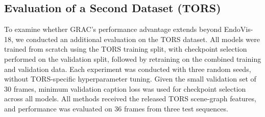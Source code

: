 \documentclass[11pt]{article}
\begin{document}
\subsection{Evaluation of a Second Dataset (TORS)}\label{subsec5.3}

To examine whether GRAC's performance advantage extends beyond EndoVis-18, we conducted an additional evaluation on the TORS dataset. All models were trained from scratch using the TORS training split, with checkpoint selection performed on the validation split, followed by retraining on the combined training and validation data. Each experiment was conducted with three random seeds, without TORS-specific hyperparameter tuning. Given the small validation set of 30 frames, minimum validation caption loss was used for checkpoint selection across all models. All methods received the released TORS scene-graph features, and performance was evaluated on 36 frames from three test sequences.
\end{document}
